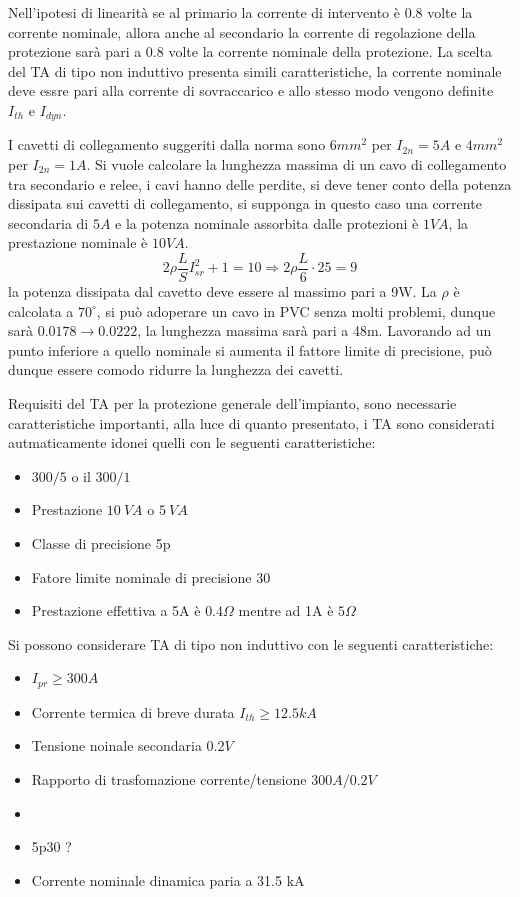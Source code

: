 Nell'ipotesi di linearità se al primario la corrente di intervento è 0.8 volte la corrente nominale, allora anche al secondario la corrente di regolazione della protezione sarà pari a 0.8 volte la corrente nominale della protezione.
La scelta del TA di tipo non induttivo presenta simili caratteristiche,
la corrente nominale deve essre pari alla corrente di sovraccarico e allo stesso modo vengono definite $I_{th}$ e $I_{dyn}$.

I cavetti di collegamento suggeriti dalla norma sono $6mm^2$ per $I_{2n} = 5A$ e $4mm^2$ per $I_{2n} = 1A$.
Si vuole calcolare la lunghezza massima di un cavo di collegamento tra secondario e relee, i cavi hanno delle perdite, si deve tener conto della potenza dissipata sui cavetti di collegamento, si supponga in questo caso una corrente secondaria di $5A$ e la potenza nominale assorbita dalle protezioni è $1VA$, la prestazione nominale è $10VA$.
$$
2\rho \frac{L}{S}I^2_{sr} + 1 = 10 \Rightarrow 2\rho\frac{L}{6}\cdot 25 = 9
$$
la potenza dissipata dal cavetto deve essere al massimo pari a 9W.
La $\rho$ è calcolata a $70^\circ$, si può adoperare un cavo in PVC senza molti problemi, dunque sarà $0.0178 \rightarrow 0.0222$, la lunghezza massima sarà pari a 48m.
Lavorando ad un punto inferiore a quello nominale si aumenta il fattore limite di precisione, può dunque essere comodo ridurre la lunghezza dei cavetti.

\newpage
Requisiti del TA per la protezione generale dell'impianto, sono necessarie caratteristiche importanti, alla luce di quanto presentato, i TA sono considerati autmaticamente idonei quelli con le seguenti caratteristiche:
\begin{itemize}
    \item $300/5$ o il $300/1$
    \item Prestazione $10\ VA$ o $5\ VA$ 
    \item Classe di precisione 5p
    \item Fatore limite nominale di precisione 30
    \item Prestazione effettiva a 5A è $0.4 \Omega$ mentre ad 1A è $5\Omega$
\end{itemize}

Si possono considerare TA di tipo non induttivo con le seguenti caratteristiche:
\begin{itemize}
    \item $I_{pr} \geq 300 A$
    \item Corrente termica di breve durata $I_{th} \geq 12.5 kA$
    \item Tensione noinale secondaria $0.2V$
    \item Rapporto di trasfomazione corrente/tensione $300A/0.2V$
    \item 
    \item 5p30 ?
    \item Corrente nominale dinamica paria a 31.5 kA
\end{itemize}

